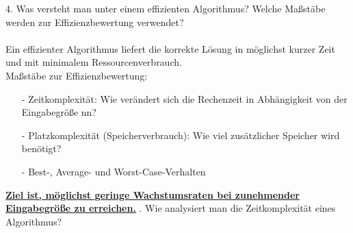 \documentclass[a4paper,12pt]{article}
\begin{document}
		4. Was versteht man unter einem effizienten Algorithmus? Welche Maßstäbe werden zur Effizienzbewertung verwendet?\\ \\
		Ein effizienter Algorithmus liefert die korrekte Lösung in möglichst kurzer Zeit und mit minimalem Ressourcenverbrauch.\\
		Maßstäbe zur Effizienzbewertung:
		\begin{enumerate}
			\item[-] Zeitkomplexität: Wie verändert sich die Rechenzeit in Abhängigkeit von der Eingabegröße nn?
			\item[-] Platzkomplexität (Speicherverbrauch): Wie viel zusätzlicher Speicher wird benötigt?
			\item[-] Best-, Average- und Worst-Case-Verhalten
		\end{enumerate}
		\textbf{\underline{Ziel ist, möglichst geringe Wachstumsraten bei zunehmender Eingabegröße zu erreichen.}}
		. Wie analysiert man die Zeitkomplexität eines Algorithmus?
\end{document}
